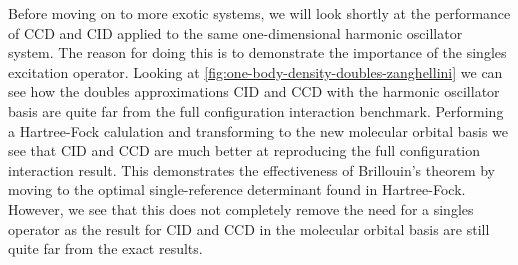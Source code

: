         Before moving on to more exotic systems, we will look shortly at the
        performance of CCD and CID applied to the same one-dimensional harmonic
        oscillator system.
        The reason for doing this is to demonstrate the importance of the
        singles excitation operator.
        Looking at \autoref{fig:one-body-density-doubles-zanghellini} we can see
        how the doubles approximations CID and CCD with the harmonic oscillator
        basis are quite far from the full configuration interaction benchmark.
        Performing a Hartree-Fock calulation and transforming to the new
        molecular orbital basis we see that CID and CCD are much better at
        reproducing the full configuration interaction result.
        This demonstrates the effectiveness of Brillouin's theorem by moving to
        the optimal single-reference determinant found in Hartree-Fock.
        However, we see that this does not completely remove the need for a
        singles operator as the result for CID and CCD in the molecular orbital
        basis are still quite far from the exact results.

